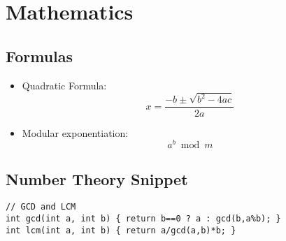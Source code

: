 \section{Mathematics}

\subsection{Formulas}
\begin{itemize}
  \item Quadratic Formula: \[
    x = \frac{-b \pm \sqrt{b^2 - 4ac}}{2a}
  \]
  \item Modular exponentiation:
  \[
    a^b \bmod m
  \]
\end{itemize}

\subsection{Number Theory Snippet}
\begin{lstlisting}
// GCD and LCM
int gcd(int a, int b) { return b==0 ? a : gcd(b,a%b); }
int lcm(int a, int b) { return a/gcd(a,b)*b; }
\end{lstlisting}